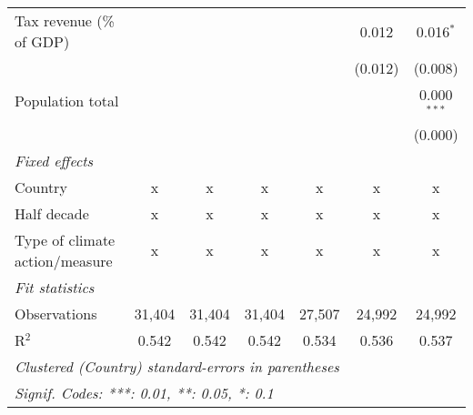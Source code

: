 \begin{tabular}{lcccccc}
   Tax revenue (\% of GDP)                         &         &         &              &              & 0.012        & 0.016$^{*}$\\   
                                                   &         &         &              &              & (0.012)      & (0.008)\\   
   Population total                                &         &         &              &              &              & 0.000$^{***}$\\   
                                                   &         &         &              &              &              & (0.000)\\   
   \emph{Fixed effects}\\
   Country                                         & x       & x       & x            & x            & x            & x\\  
   Half decade                                     & x       & x       & x            & x            & x            & x\\  
   Type of climate action/measure                  & x       & x       & x            & x            & x            & x\\  
   \midrule \emph{Fit statistics}\\
   Observations                                    & 31,404  & 31,404  & 31,404       & 27,507       & 24,992       & 24,992\\  
   R$^2$                                           & 0.542   & 0.542   & 0.542        & 0.534        & 0.536        & 0.537\\  
   \midrule
   \multicolumn{7}{l}{\emph{Clustered (Country) standard-errors in parentheses}}\\
   \multicolumn{7}{l}{\emph{Signif. Codes: ***: 0.01, **: 0.05, *: 0.1}}\\
\end{tabular}
\par\endgroup


